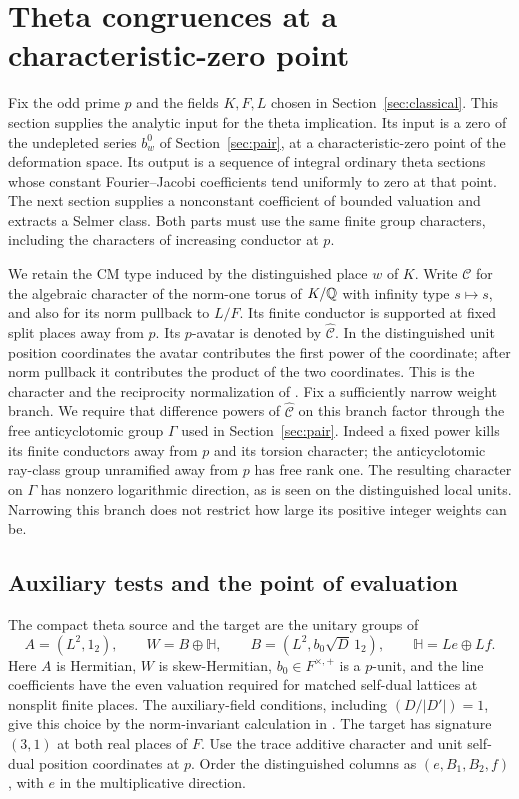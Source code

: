 \section{Theta congruences at a characteristic-zero point}
\label{sec:theta}

Fix the odd prime $p$ and the fields $K,F,L$ chosen in
Section~\ref{sec:classical}.  This section supplies the analytic input
for the theta implication.  Its input is a zero of the undepleted
series $b_w^0$ of Section~\ref{sec:pair}, at a characteristic-zero point
of the deformation space.  Its output is a sequence of integral
ordinary theta sections whose constant Fourier--Jacobi coefficients
tend uniformly to zero at that point.  The next section supplies a
nonconstant coefficient of bounded valuation and extracts a Selmer
class.  Both parts must use the same finite group characters, including
the characters of increasing conductor at $p$.

We retain the CM type induced by the distinguished place $w$ of $K$.
Write $\mathcal C$ for the algebraic character of the norm-one torus
of $K/\mathbb Q$ with infinity type $s\mapsto s$, and also for its norm
pullback to $L/F$.  Its finite conductor is supported at fixed split
places away from $p$.  Its $p$-avatar is denoted by
$\widehat{\mathcal C}$.  In the distinguished unit position coordinates
the avatar contributes the first power of the coordinate; after norm
pullback it contributes the product of the two coordinates.  This is
the character and the reciprocity normalization of
\cite[Section 2, ``Coefficient, character, and measure conventions'']{C}.
Fix a sufficiently narrow weight branch.  We require that difference
powers of $\widehat{\mathcal C}$ on this branch factor through the
free anticyclotomic group $\Gamma$ used in Section~\ref{sec:pair}.
Indeed a fixed power kills its finite conductors away from $p$ and its
torsion character; the anticyclotomic ray-class group unramified away
from $p$ has free rank one.  The resulting character on $\Gamma$ has
nonzero logarithmic direction, as is seen on the distinguished local
units.  Narrowing this branch does not restrict how large its positive
integer weights can be.

\subsection{Auxiliary tests and the point of evaluation}

The compact theta source and the target are the unitary groups of
\[
 A=(L^2,1_2),\qquad
 W=B\oplus\mathbb H,\qquad
 B=(L^2,b_0\sqrt D\,1_2),\qquad
 \mathbb H=Le\oplus Lf.
\]
Here $A$ is Hermitian, $W$ is skew-Hermitian, $b_0\in F^{\times,+}$
is a $p$-unit, and the line coefficients have the even valuation
required for matched self-dual lattices at nonsplit finite places.
The auxiliary-field conditions, including $(D/|D'|)=1$, give this
choice by the norm-invariant calculation in
\cite[Equations (4.1)--(4.2)]{C}.  The target has signature $(3,1)$ at
both real places of $F$.  Use the trace additive character and unit
self-dual position coordinates at $p$.  Order the distinguished
columns as $(e,B_1,B_2,f)$, with $e$ in the multiplicative direction.

